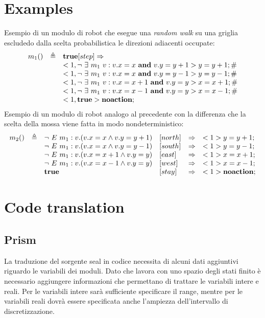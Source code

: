 \section{Examples}
Esempio di un modulo di robot che esegue una \emph{random walk} su una griglia escludedo dalla scelta probabilistica le direzioni adiacenti occupate:
$$
\begin{array}{rcl}
m_1 () & \triangleq & \mathbf{true} [step]\Rightarrow \\ 
	& & <1, \neg \mbox{ } \exists \mbox{ } m_1 \mbox{ } v: v.x=x \mbox{ } \mathbf{and} \mbox{ } v.y=y+1> y=y+1; \# \\
	& & <1, \neg \mbox{ } \exists \mbox{ } m_1 \mbox{ } v: v.x=x \mbox{ } \mathbf{and} \mbox{ } v.y=y-1> y=y-1; \# \\ 
	& & <1, \neg \mbox{ } \exists \mbox{ } m_1 \mbox{ } v: v.x=x+1 \mbox{ } \mathbf{and} \mbox{ } v.y=y> x=x+1; \# \\ 
	& & <1, \neg \mbox{ } \exists \mbox{ } m_1 \mbox{ } v: v.x=x-1 \mbox{ } \mathbf{and} \mbox{ } v.y=y> x=x-1; \# \\ 
	& & <1, \mathbf{true}> \mathbf{noaction};\\ 
\end{array}
$$
Esempio di un modulo di robot analogo al precedente con la differenza che la scelta della mossa viene fatta in modo nondeterministico:
$$
\begin{array}{rcllcl}
m_2 () & \triangleq & \neg \mbox{ } E \mbox{ } m_1 : v . (v.x=x \wedge v.y=y+1) &[north]&\Rightarrow& <1> y=y+1; \\ 
	& & \neg \mbox{ } E \mbox{ } m_1 : v . (v.x=x \wedge v.y=y-1) &[south]&\Rightarrow& <1> y=y-1; \\ 
	& & \neg \mbox{ } E \mbox{ } m_1 : v . (v.x=x+1 \wedge v.y=y) &[east]&\Rightarrow& <1> x=x+1; \\ 
	& & \neg \mbox{ } E \mbox{ } m_1 : v . (v.x=x-1 \wedge v.y=y) &[west]&\Rightarrow& <1> x=x-1; \\ 
	& & \mathbf{true} &[stay]&\Rightarrow& <1> \mathbf{noaction}; \\ 
\end{array}
$$

\section{Code translation}
\subsection{Prism}
La traduzione del sorgente \ac{seal} in codice \prism{} necessita di alcuni dati aggiuntivi riguardo le variabili dei moduli. Dato che \prism{} lavora con uno spazio degli stati finito è necessario aggiungere informazioni che permettano di trattare le variabili intere e reali. Per le variabili intere sarà sufficiente specificare il range, mentre per le variabili reali dovrà essere specificata anche l'ampiezza dell'intervallo di discretizzazione.

